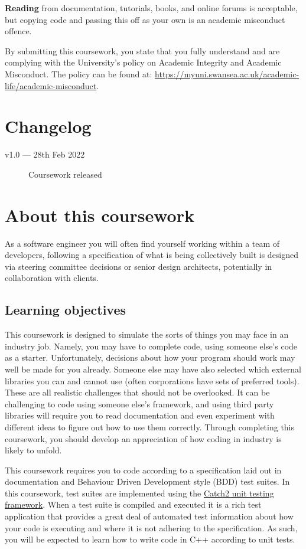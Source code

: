 \documentclass[a4paper]{article}
\begin{document}
\textbf{Reading} from documentation, tutorials, books, and online forums is acceptable, but copying code and passing this off as your own is an academic misconduct offence.

By submitting this coursework, you state that you fully understand and are complying with the University’s policy on Academic Integrity and Academic Misconduct. The policy can be found at: \url{https://myuni.swansea.ac.uk/academic-life/academic-misconduct}.


\section*{Changelog}\label{sec:changelog}
\begin{description}
    \item[v1.0 --- 28th Feb 2022] Coursework released
\end{description}



\newpage\section*{About this coursework}\label{sec:about}
As a software engineer you will often find yourself working within a team of developers, following a specification of what is being collectively built is designed via steering committee decisions or senior design architects, potentially in collaboration with clients. 

\subsection*{Learning objectives}
This coursework is designed to simulate the sorts of things you may face in an industry job. Namely, you may have to complete code, using someone else’s code as a starter. Unfortunately, decisions about how your program should work may well be made for you already. Someone else may have also selected which external libraries you can and cannot use (often corporations have sets of preferred tools). These are all realistic challenges that should not be overlooked. It can be challenging to code using someone else’s framework, and using third party libraries will require you to read documentation and even experiment with different ideas to figure out how to use them correctly. Through completing this coursework, you should develop an appreciation of how coding in industry is likely to unfold.

This coursework requires you to code according to a specification laid out in documentation and Behaviour Driven Development style (BDD) test suites. In this coursework, test suites are implemented using the \href{https://github.com/catchorg/Catch2}{Catch2 unit testing framework}. When a test suite is compiled and executed it is a rich test application that provides a great deal of automated test information about how your code is executing and where it is not adhering to the specification. As such, you will be expected to learn how to write code in C++ according to unit tests.
\end{document}

